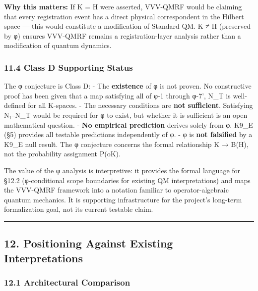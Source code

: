 \documentclass[
  11pt,
]{article}
\begin{document}
\textbf{Why this matters:} If K = H were asserted, VVV-QMRF would be
claiming that every registration event has a direct physical
correspondent in the Hilbert space --- this would constitute a
modification of Standard QM. K ≠ H (preserved by φ) ensures VVV-QMRF
remains a registration-layer analysis rather than a modification of
quantum dynamics.

\subsubsection{11.4 Class D Supporting
Status}\label{class-d-supporting-status}

The φ conjecture is Class D: - The \textbf{existence} of φ is not
proven. No constructive proof has been given that a map satisfying all
of φ-1 through φ-7', N\_T is well-defined for all K-spaces. - The
necessary conditions are \textbf{not sufficient}. Satisfying N₁--N\_T
would be required for φ to exist, but whether it is sufficient is an
open mathematical question. - \textbf{No empirical prediction} derives
solely from φ. K9\_E (§5) provides all testable predictions
independently of φ. - φ is \textbf{not falsified} by a K9\_E null
result. The φ conjecture concerns the formal relationship K → B(H), not
the probability assignment P(o\textbar K).

The value of the φ analysis is interpretive: it provides the formal
language for §12.2 (φ-conditional scope boundaries for existing QM
interpretations) and maps the VVV-QMRF framework into a notation
familiar to operator-algebraic quantum mechanics. It is supporting
infrastructure for the project's long-term formalization goal, not its
current testable claim.

\begin{center}\rule{0.5\linewidth}{0.5pt}\end{center}

\subsection{12. Positioning Against Existing
Interpretations}\label{positioning-against-existing-interpretations}

\subsubsection{12.1 Architectural
Comparison}\label{architectural-comparison}
\end{document}
